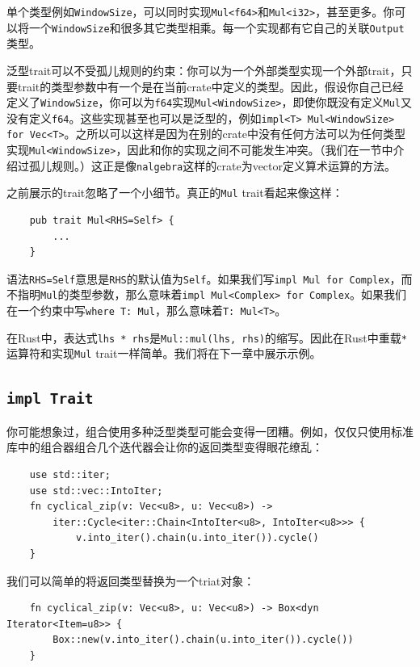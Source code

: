 单个类型例如\texttt{WindowSize}，可以同时实现\texttt{Mul<f64>}和\texttt{Mul<i32>}，甚至更多。你可以将一个\texttt{WindowSize}和很多其它类型相乘。每一个实现都有它自己的关联\texttt{Output}类型。

泛型trait可以不受孤儿规则的约束：你可以为一个外部类型实现一个外部trait，只要trait的类型参数中有一个是在当前crate中定义的类型。因此，假设你自己已经定义了\texttt{WindowSize}，你可以为\texttt{f64}实现\texttt{Mul<WindowSize>}，即使你既没有定义\texttt{Mul}又没有定义\texttt{f64}。这些实现甚至也可以是泛型的，例如\texttt{impl<T> Mul<WindowSize> for Vec<T>}。之所以可以这样是因为在别的crate中没有任何方法可以为任何类型实现\texttt{Mul<WindowSize>}，因此和你的实现之间不可能发生冲突。（我们在一节中介绍过孤儿规则。）这正是像\texttt{nalgebra}这样的crate为vector定义算术运算的方法。

之前展示的trait忽略了一个小细节。真正的\texttt{Mul} trait看起来像这样：
\begin{verbatim}
    pub trait Mul<RHS=Self> {
        ...
    }
\end{verbatim}

语法\texttt{RHS=Self}意思是\texttt{RHS}的默认值为\texttt{Self}。如果我们写\texttt{impl Mul for Complex}，而不指明\texttt{Mul}的类型参数，那么意味着\texttt{impl Mul<Complex> for Complex}。如果我们在一个约束中写\texttt{where T: Mul}，那么意味着\texttt{T: Mul<T>}。

在Rust中，表达式\texttt{lhs * rhs}是\texttt{Mul::mul(lhs, rhs)}的缩写。因此在Rust中重载\texttt{*}运算符和实现\texttt{Mul} trait一样简单。我们将在下一章中展示示例。

\subsection{\texttt{impl Trait}}
你可能想象过，组合使用多种泛型类型可能会变得一团糟。例如，仅仅只使用标准库中的组合器组合几个迭代器会让你的返回类型变得眼花缭乱：
\begin{verbatim}
    use std::iter;
    use std::vec::IntoIter;
    fn cyclical_zip(v: Vec<u8>, u: Vec<u8>) ->
        iter::Cycle<iter::Chain<IntoIter<u8>, IntoIter<u8>>> {
            v.into_iter().chain(u.into_iter()).cycle()
    }
\end{verbatim}

我们可以简单的将返回类型替换为一个triat对象：
\begin{verbatim}
    fn cyclical_zip(v: Vec<u8>, u: Vec<u8>) -> Box<dyn Iterator<Item=u8>> {
        Box::new(v.into_iter().chain(u.into_iter()).cycle())
    }
\end{verbatim}

